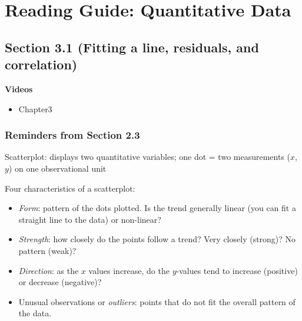 \documentclass[
]{report}
\providecommand{\tightlist}{%
  \setlength{\itemsep}{0pt}\setlength{\parskip}{0pt}}
\begin{document}
\hypertarget{reading-guide-quantitative-data-1}{%
\section{Reading Guide: Quantitative Data}\label{reading-guide-quantitative-data-1}}

\hypertarget{section-3.1-fitting-a-line-residuals-and-correlation}{%
\subsection*{Section 3.1 (Fitting a line, residuals, and correlation)}\label{section-3.1-fitting-a-line-residuals-and-correlation}}


\textbf{Videos}

\begin{itemize}
\tightlist
\item
  Chapter3
\end{itemize}


\hypertarget{reminders-from-section-2.3}{%
\subsubsection*{Reminders from Section 2.3}\label{reminders-from-section-2.3}}

Scatterplot: displays two quantitative variables; one dot = two measurements (\(x\), \(y\)) on one observational unit

Four characteristics of a scatterplot:

\begin{itemize}
\tightlist
\item
  \emph{Form}: pattern of the dots plotted. Is the trend generally linear (you can fit a straight line to the data) or non-linear?\\
\item
  \emph{Strength}: how closely do the points follow a trend? Very closely (strong)? No pattern (weak)?\\
\item
  \emph{Direction}: as the \(x\) values increase, do the \(y\)-values tend to increase (positive) or decrease (negative)?\\
\item
  Unusual observations or \emph{outliers}: points that do not fit the overall pattern of the data.
\end{itemize}
\end{document}
